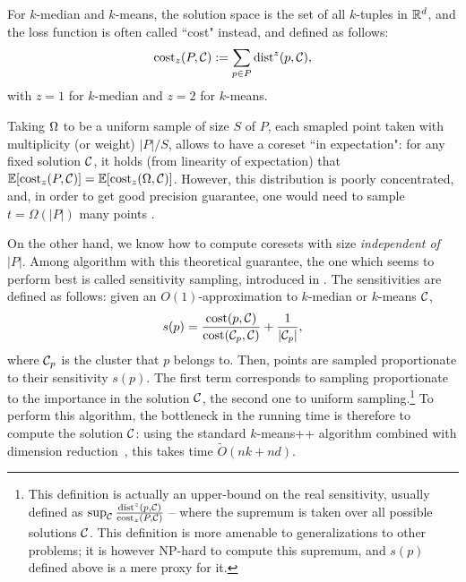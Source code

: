 For $k$-median and $k$-means, the solution space is the set of all $k$-tuples in $\mathbb{R}^d$, and the loss function is often called ``cost" instead, and defined as follows:
\[\operatorname{cost}_z(P, \mathcal C) := \sum_{p \in P} \operatorname{dist}^z(p, \mathcal C),\]
with $z=1$ for $k$-median and $z=2$ for $k$-means.

Taking $\Omega$ to be a uniform sample of size $S$ of $P$, each smapled point taken with multiplicity (or weight) $|P|/S$, allows to have a coreset ``in expectation": for any fixed solution $\mathcal C$, it holds (from linearity of expectation) that $\mathbb{E}[\operatorname{cost}_z(P, \mathcal C)] = \mathbb{E}[\operatorname{cost}_z(\Omega, \mathcal C)]$. However, this distribution is poorly concentrated, and, in order to get good precision guarantee, one would need to sample $t = \Omega(|P|)$ many points \cite{bachem2017practical}. 


On the other hand, we know how to compute coresets with size \textit{independent of $|P|$}. Among algorithm with this theoretical guarantee, the one which seems
to perform best is called sensitivity sampling, introduced in \cite{LS10, FeldmanL11}.  
The sensitivities are defined as follows: given an $O(1)$-approximation to $k$-median or $k$-means $\mathcal C$, 
\begin{equation}
\label{eq:sensitivity}
 s(p) = \dfrac{\operatorname{cost}(p, \mathcal C)}{\operatorname{cost}(\mathcal C_{p}, \mathcal C)} + \dfrac{1}{|\mathcal C_p|},
\end{equation}
where $\mathcal C_p$ is the cluster that $p$ belongs to. Then, points are sampled proportionate to their sensitivity $s(p)$. 
The first term corresponds to sampling proportionate to the importance in the solution $\mathcal C$, the second one to uniform sampling.\footnote{This definition is actually an upper-bound on the real sensitivity, 
usually defined as $\sup_{\mathcal C} \frac{\operatorname{dist}^z(p, \mathcal C)}{\operatorname{cost}_z(P, \mathcal C)}$ -- where the supremum is taken over all possible solutions $\mathcal C$.
 This definition is more amenable to generalizations to other problems; it is however NP-hard to compute this supremum, and $s(p)$ defined above is a mere proxy for it.}
 To perform this algorithm, the bottleneck in the running time is therefore to compute the solution $\mathcal C$: using the standard $k$-means++ algorithm \cite{ArV07} combined with dimension reduction~\cite{makarychev2019performance}, this takes time $\tilde O(nk +nd)$. 




